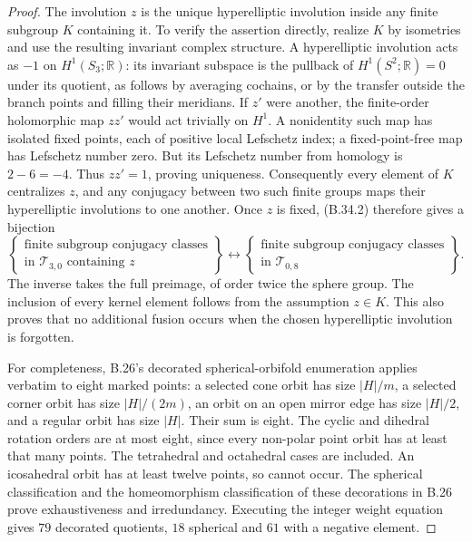 \begin{proof}
The involution $z$ is the unique hyperelliptic involution inside any
finite subgroup $K$ containing it.  To verify the assertion directly,
realize $K$ by isometries and use the resulting invariant complex
structure.  A hyperelliptic involution acts as $-1$ on $H^1(S_3;\mathbb R)$:
its invariant subspace is the pullback of $H^1(S^2;\mathbb R)=0$ under
its quotient, as follows by averaging cochains, or by the transfer
outside the branch points and filling their meridians.  If $z'$ were
another, the finite-order holomorphic map $zz'$ would act trivially on
$H^1$.  A nonidentity such map has isolated fixed points, each of
positive local Lefschetz index; a fixed-point-free map has Lefschetz
number zero.  But its Lefschetz number from homology is $2-6=-4$.
Thus $zz'=1$, proving uniqueness.
Consequently every element of $K$ centralizes $z$, and any conjugacy
between two such finite groups maps their hyperelliptic involutions
to one another.  Once $z$ is fixed, (B.34.2) therefore gives a bijection
\[
 \left\{\begin{array}{c}\text{finite subgroup conjugacy classes}\\
 \text{in }\mathcal T_{3,0}\text{ containing }z\end{array}\right\}
 \longleftrightarrow
 \left\{\begin{array}{c}\text{finite subgroup conjugacy classes}\\
 \text{in }\mathcal T_{0,8}\end{array}\right\}.
                                                        \tag{B.34.3}
\]
The inverse takes the full preimage, of order twice the sphere group.
The inclusion of every kernel element follows from the assumption
$z\in K$.  This also proves that no additional fusion occurs when the
chosen hyperelliptic involution is forgotten.

For completeness, B.26's decorated spherical-orbifold enumeration
applies verbatim to eight marked points: a selected cone orbit has
size $|H|/m$, a selected corner orbit has size $|H|/(2m)$, an orbit
on an open mirror edge has size $|H|/2$, and a regular orbit has size
$|H|$.  Their sum is eight.  The cyclic and dihedral rotation orders
are at most eight, since every non-polar point orbit has at least that
many points.  The tetrahedral and octahedral cases are included.
An icosahedral orbit has at least twelve points, so cannot occur.
The spherical classification and the homeomorphism classification
of these decorations in B.26 prove exhaustiveness and irredundancy.
Executing the integer weight equation gives $79$ decorated quotients,
$18$ spherical and $61$ with a negative element.


\end{proof}
